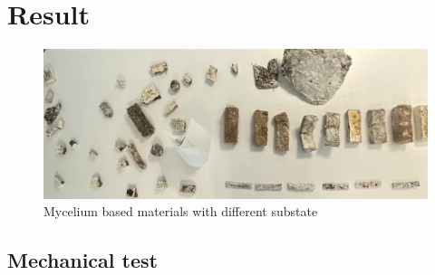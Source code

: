 \section{Result}


\begin{figure}[h]
    \centering
    \includegraphics{images/resultMyce.png}
    \caption{Mycelium based materials with different substate}
    \label{fig:Mycemachinne}
\end{figure} 


\subsection{Mechanical test}


